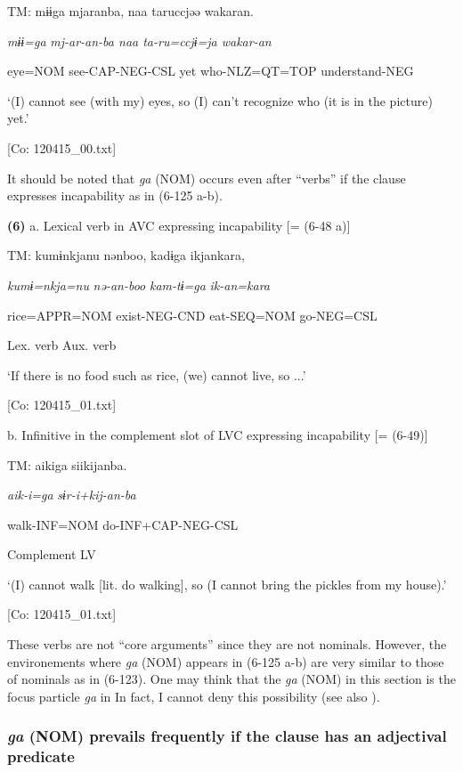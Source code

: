   TM:  mɨɨga  mjaranba,  naa  taruccjəə  wakaran.

    \textit{mɨɨ=ga}  \textit{mj-ar-an{}-ba  naa  ta-ru=ccjɨ=ja  wakar-an}

    eye=NOM  see-CAP-NEG-CSL  yet  who-NLZ=QT=TOP  understand-NEG

    ‘(I) cannot see (with my) eyes, so (I) can’t recognize who (it is in the picture) yet.’

    [Co: 120415\_00.txt]

It should be noted that \textit{ga} (NOM) occurs even after “verbs” if the clause expresses incapability as in (6-125 a-b).

\textbf{(6)}  a. Lexical verb in AVC expressing incapability [= (6-48 a)]

  TM:  kumɨnkjanu  nənboo,  kadɨga  ikjankara,

    \textit{kumɨ=nkja=nu}  \textit{nə-an-boo}  \textit{kam-tɨ=ga}  \textit{ik-an=kara}

    rice=APPR=NOM  exist-NEG-CND  eat-SEQ=NOM  go-NEG=CSL

        Lex. verb  Aux. verb

    ‘If there is no food such as rice, (we) cannot live, so ...’

    [Co: 120415\_01.txt]

  b. Infinitive in the complement slot of LVC expressing incapability [= (6-49)]

  TM:  aikiga  siikijanba.

    \textit{aik-i=ga}  \textit{sɨr-i+kij-an{}-ba}

    walk-INF=NOM  do-INF+CAP-NEG-CSL

    Complement  LV

    ‘(I) cannot walk [lit. do walking], so (I cannot bring the pickles from my house).’

  [Co: 120415\_01.txt]

These verbs are not “core arguments” since they are not nominals. However, the environements where \textit{ga} (NOM) appears in (6-125 a-b) are very similar to those of nominals as in (6-123). One may think that the \textit{ga} (NOM) in this section is the focus particle \textit{ga} in  In fact, I cannot deny this possibility (see also ).

\subsubsection{\textit{ga} (NOM) prevails frequently if the clause has an adjectival predicate}

